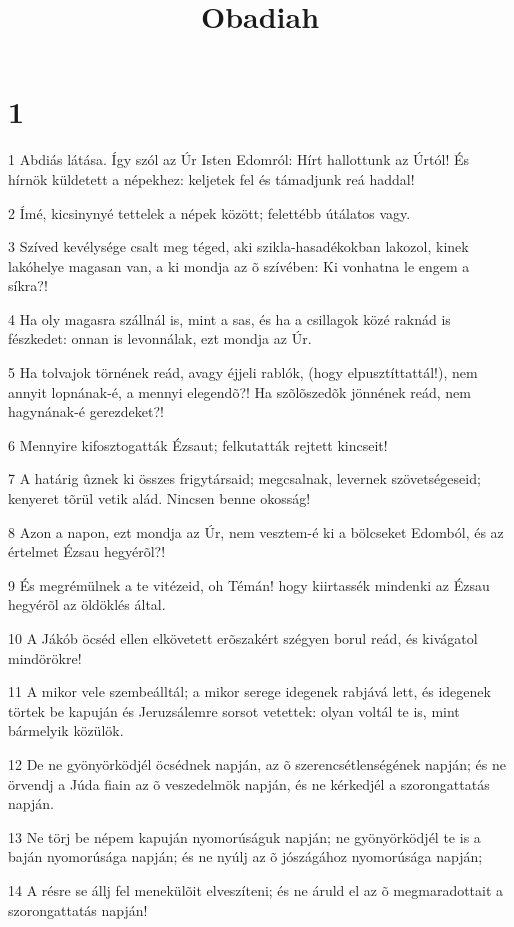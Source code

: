 

\title{Obadiah}


\chapter{1}

\par 1 Abdiás látása. Így szól az Úr Isten Edomról: Hírt hallottunk az Úrtól! És hírnök küldetett a népekhez: keljetek fel és támadjunk reá haddal!
\par 2 Ímé, kicsinynyé tettelek a népek között; felettébb útálatos vagy.
\par 3 Szíved kevélysége csalt meg téged, aki szikla-hasadékokban lakozol, kinek lakóhelye magasan van, a ki mondja az õ szívében: Ki vonhatna le engem a síkra?!
\par 4 Ha oly magasra szállnál is, mint a sas, és ha a csillagok közé raknád is fészkedet: onnan is levonnálak, ezt mondja az Úr.
\par 5 Ha tolvajok törnének reád, avagy éjjeli rablók, (hogy elpusztíttattál!), nem annyit lopnának-é, a mennyi elegendõ?! Ha szõlõszedõk jönnének reád, nem hagynának-é gerezdeket?!
\par 6 Mennyire kifosztogatták Ézsaut; felkutatták rejtett kincseit!
\par 7 A határig ûznek ki összes frigytársaid; megcsalnak, levernek szövetségeseid; kenyeret tõrül vetik alád. Nincsen benne okosság!
\par 8 Azon a napon, ezt mondja az Úr, nem vesztem-é ki a bölcseket Edomból, és az értelmet Ézsau hegyérõl?!
\par 9 És megrémülnek a te vitézeid, oh Témán! hogy kiirtassék mindenki az Ézsau hegyérõl az öldöklés által.
\par 10 A Jákób öcséd ellen elkövetett erõszakért szégyen borul reád, és kivágatol mindörökre!
\par 11 A mikor vele szembeálltál; a mikor serege idegenek rabjává lett, és idegenek törtek be kapuján és Jeruzsálemre sorsot vetettek: olyan voltál te is, mint bármelyik közülök.
\par 12 De ne gyönyörködjél öcsédnek napján, az õ szerencsétlenségének napján; és ne örvendj a Júda fiain az õ veszedelmök napján, és ne kérkedjél a szorongattatás napján.
\par 13 Ne törj be népem kapuján nyomorúságuk napján; ne gyönyörködjél te is a baján nyomorúsága napján; és ne nyúlj az õ jószágához nyomorúsága napján;
\par 14 A résre se állj fel menekülõit elveszíteni; és ne áruld el az õ megmaradottait a szorongattatás napján!
